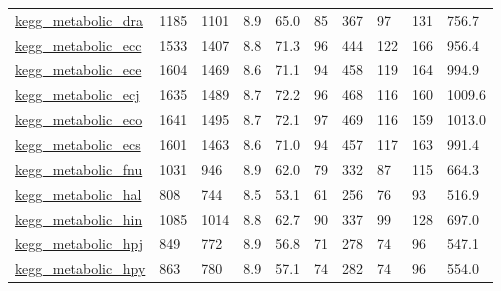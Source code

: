 \begin{longtable}{llllllllll}
 \href{http://santafe.edu/~aaronc/data/kegg2006_metabolic.zip}{kegg\_metabolic\_dra}                                          & 1185       & 1101  & 8.9    & 65.0   & 85    & 367    & 97     & 131    & 756.7   \\
 \href{http://santafe.edu/~aaronc/data/kegg2006_metabolic.zip}{kegg\_metabolic\_ecc}                                          & 1533       & 1407  & 8.8    & 71.3   & 96    & 444    & 122    & 166    & 956.4   \\
 \href{http://santafe.edu/~aaronc/data/kegg2006_metabolic.zip}{kegg\_metabolic\_ece}                                          & 1604       & 1469  & 8.6    & 71.1   & 94    & 458    & 119    & 164    & 994.9   \\
 \href{http://santafe.edu/~aaronc/data/kegg2006_metabolic.zip}{kegg\_metabolic\_ecj}                                          & 1635       & 1489  & 8.7    & 72.2   & 96    & 468    & 116    & 160    & 1009.6  \\
 \href{http://santafe.edu/~aaronc/data/kegg2006_metabolic.zip}{kegg\_metabolic\_eco}                                          & 1641       & 1495  & 8.7    & 72.1   & 97    & 469    & 116    & 159    & 1013.0  \\
 \href{http://santafe.edu/~aaronc/data/kegg2006_metabolic.zip}{kegg\_metabolic\_ecs}                                          & 1601       & 1463  & 8.6    & 71.0   & 94    & 457    & 117    & 163    & 991.4   \\
 \href{http://santafe.edu/~aaronc/data/kegg2006_metabolic.zip}{kegg\_metabolic\_fnu}                                          & 1031       & 946   & 8.9    & 62.0   & 79    & 332    & 87     & 115    & 664.3   \\
 \href{http://santafe.edu/~aaronc/data/kegg2006_metabolic.zip}{kegg\_metabolic\_hal}                                          & 808        & 744   & 8.5    & 53.1   & 61    & 256    & 76     & 93     & 516.9   \\
 \href{http://santafe.edu/~aaronc/data/kegg2006_metabolic.zip}{kegg\_metabolic\_hin}                                          & 1085       & 1014  & 8.8    & 62.7   & 90    & 337    & 99     & 128    & 697.0   \\
 \href{http://santafe.edu/~aaronc/data/kegg2006_metabolic.zip}{kegg\_metabolic\_hpj}                                          & 849        & 772   & 8.9    & 56.8   & 71    & 278    & 74     & 96     & 547.1   \\
 \href{http://santafe.edu/~aaronc/data/kegg2006_metabolic.zip}{kegg\_metabolic\_hpy}                                          & 863        & 780   & 8.9    & 57.1   & 74    & 282    & 74     & 96     & 554.0   \\

\end{longtable}
